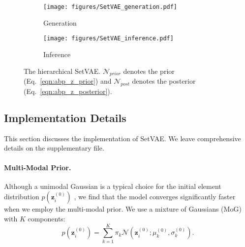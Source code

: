 \documentclass[final]{arxiv/cvpr}
\newcommand{\cutsubsectiondown}{\vspace*{-0.07in}}
\newcommand{\cutparagraphup}{\vspace*{-0.1in}}
\begin{document}
\begin{figure}[t!]
    \centering
    \begin{subfigure}[b]{0.17\textwidth}
        \centering
        \texttt{[image: figures/SetVAE\_generation.pdf]}
        \vspace{-0.1cm}
        \caption{Generation}
        \label{fig:setvae_generation}
    \end{subfigure}
    \hfill
    \begin{subfigure}[b]{0.3\textwidth}
        \centering
        \texttt{[image: figures/SetVAE\_inference.pdf]}
        \vspace{-0.1cm}
        \caption{Inference}
        \label{fig:setvae_inference}
    \end{subfigure}
    \vspace{-0.6cm}
    \caption{The hierarchical SetVAE.
    $\mathcal{N}_{prior}$ denotes the prior (Eq.~\eqref{eqn:abp_z_prior}) and $\mathcal{N}_{post}$ denotes the posterior (Eq.~\eqref{eqn:abp_z_posterior}).
    }
    \vspace{-0.5cm}
\label{fig:overview}
\end{figure}

\subsection{Implementation Details}
\label{sec:implementation}
\cutsubsectiondown
This section discusses the implementation of SetVAE.
We leave comprehensive details on the supplementary file.

\cutparagraphup
\paragraph{Multi-Modal Prior.} 
Although a unimodal Gaussian is a typical choice for the initial element distribution $p(\mathbf{z}^{(0)}_i)$ \cite{kosiorek2020conditional, yang2019pointflow}, we find that the model converges significantly faster when we employ the multi-modal prior.
We use a mixture of Gaussians (MoG) with $K$ components:
\begin{equation}
    p(\mathbf{z}^{(0)}_i) = \sum_{k=1}^K{\pi_k\mathcal{N}(\mathbf{z}^{(0)}_i;\mu^{(0)}_k, \sigma^{(0)}_k)}.
    \label{eqn:prior_mog}
\end{equation}

\cutparagraphup
\end{document}
